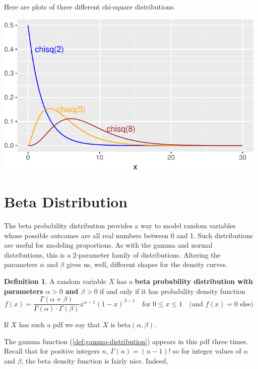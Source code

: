 \documentclass[
]{book}
\theoremstyle{definition}
\newtheorem{definition}{Definition}[chapter]
\theoremstyle{definition}
\theoremstyle{definition}
\theoremstyle{definition}
\theoremstyle{remark}
\begin{document}
Here are plots of three different chi-square distributions.

\begin{center}\includegraphics{math340-notes_files/figure-latex/unnamed-chunk-23-1} \end{center}

\section{Beta Distribution}\label{beta-distribution}

The beta probability distribution provides a way to model random variables whose possible outcomes are all real numbers between 0 and 1. Such distributions are useful for modeling proportions. As with the gamma and normal distributions, this is a 2-parameter family of distributions. Altering the parameters \(\alpha\) and \(\beta\) gives us, well, different shapes for the density curves.

\begin{definition}
\protect\hypertarget{def:beta-distribution}{}\label{def:beta-distribution}A random variable \(X\) has a \textbf{beta probability distribution with parameters \(\alpha>0\) and \(\beta>0\)} if and only if it has probability density function
\[
f(x)=
\frac{\Gamma(\alpha + \beta)}{\Gamma(\alpha)\cdot \Gamma(\beta)}x^{\alpha-1}(1-x)^{\beta-1}~~~ \text{ for }0 \leq x \leq 1~~~ \text{ (and }f(x) = 0\text{ else)}
\]

If \(X\) has such a pdf we say that \(X\) is \(\text{beta}(\alpha,\beta)\).
\end{definition}

The gamma function (\ref{def:gamma-distribution}) appears in this pdf three times. Recall that for positive integers \(n\), \(\Gamma(n) = (n-1)!\) so for integer values of \(\alpha\) and \(\beta\), the beta density function is fairly nice.
Indeed,
\end{document}
